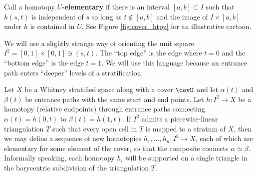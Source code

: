 \begin{defn}
	Call a homotopy \textbf{$U$-elementary} if there is an interval $[a,b]\subset I$ such that $h(s,t)$ is independent of $s$ so long as $t\notin [a,b]$ and the image of $I\times [a,b]$ under $h$ is contained in $U$. See Figure \ref{fig:cover_htpy} for an illustrative cartoon.
\end{defn}

\begin{rmk}
	We will use a slightly strange way of orienting the unit square $I^2=[0,1]\times [0,1]\ni (s,t)$. The ``top edge'' is the edge where $t=0$ and the ``bottom edge'' is the edge $t=1$. We will use this language because an entrance path enters ``deeper'' levels of a stratification.
\end{rmk}


\begin{lem}\label{lem:vkt_alg}
	Let $X$ be a Whitney stratified space along with a cover $\covU$ and let $\alpha(t)$ and $\beta(t)$ be entrance paths with the same start and end points. Let $h:I^2\to X$ be a homotopy (relative endpoints) through entrance paths connecting $\alpha(t)=h(0,t)$ to $\beta(t)=h(1,t)$. If $I^2$ admits a piecewise-linear triangulation $T$ such that every open cell in $T$ is mapped to a stratum of $X$, then we may define a sequence of new homotopies $h_1,\ldots, h_n:I^2\to X$, each of which are elementary for some element of the cover, so that the composite connects $\alpha\simeq \beta$. Informally speaking, each homotopy $h_i$ will be supported on a single triangle in the barycentric subdivision of the triangulation $T$.
\end{lem}
